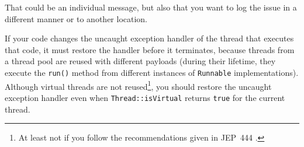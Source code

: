 That  could be an individual message, but also that you want to log the issue in a different manner or to another location.

If your code changes the uncaught exception handler of the thread that executes that code, it must restore the handler before it terminates, because threads from a thread pool are reused with different payloads (during their lifetime, they execute the \lstinline|run()| method from different instances of \lstinline|Runnable| implementations). Although virtual threads are not reused\footnote{At least not if you follow the recommendations given in JEP~444 \autocite{JEP444:Pooling}.}, you should restore the uncaught exception handler even when \lstinline|Thread::isVirtual| \autocite{ORACLE_DOC_THREAD:isVirtual} returns \lstinline|true| for the current thread.

